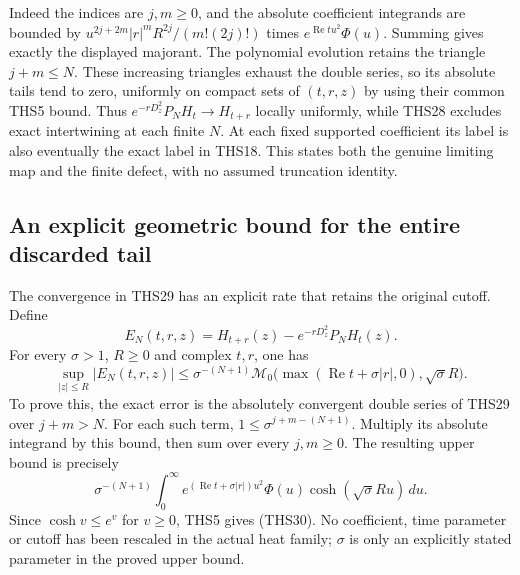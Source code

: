 Indeed the indices are $j,m\ge0$, and the absolute coefficient
integrands are bounded by
$u^{2j+2m}|r|^mR^{2j}/(m!(2j)!)$ times
$e^{\operatorname{Re}tu^2}\Phi(u)$. Summing gives exactly
the displayed majorant. The polynomial evolution retains the
triangle $j+m\le N$. These increasing triangles exhaust the
double series, so its absolute tails tend to zero, uniformly
on compact sets of $(t,r,z)$ by using their common THS5 bound.
Thus $e^{-rD_z^2}P_NH_t\to H_{t+r}$ locally uniformly, while
THS28 excludes exact intertwining at each finite $N$.
At each fixed supported coefficient its label is also eventually
the exact label in THS18. This states both the genuine limiting
map and the finite defect, with no assumed truncation identity.
\subsection{An explicit geometric bound for the entire discarded tail}
The convergence in THS29 has an explicit rate that retains the
original cutoff. Define
\[
 E_N(t,r,z)=H_{t+r}(z)-e^{-rD_z^2}P_NH_t(z).
\]
For every $\sigma>1$, $R\ge0$ and complex $t,r$, one has
\begin{equation}\tag{THS30}
 \sup_{|z|\le R}|E_N(t,r,z)|
 \le\sigma^{-(N+1)}
 \mathcal M_0\bigl(\max(\operatorname{Re}t+\sigma|r|,0),
                         \sqrt\sigma R\bigr).
\end{equation}
To prove this, the exact error is the absolutely convergent
double series of THS29 over $j+m>N$. For each such term,
$1\le\sigma^{j+m-(N+1)}$. Multiply its absolute integrand by
this bound, then sum over every $j,m\ge0$. The resulting upper
bound is precisely
\[
 \sigma^{-(N+1)}\int_0^\infty
 e^{(\operatorname{Re}t+\sigma|r|)u^2}\Phi(u)
                  \cosh(\sqrt\sigma R u)\,du.
\]
Since $\cosh v\le e^v$ for $v\ge0$, THS5 gives (THS30).
No coefficient, time parameter or cutoff has been rescaled in
the actual heat family; $\sigma$ is only an explicitly stated
parameter in the proved upper bound.

